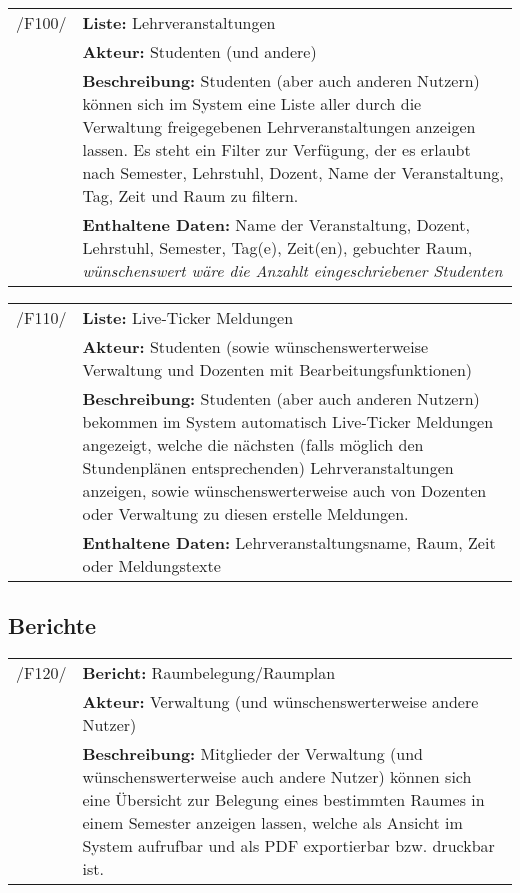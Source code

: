 \begin{tabular}{p{1.5cm}p{14.5cm}}
	
	 /F100/& \textbf{Liste:} Lehrveranstaltungen \\
				& \textbf{Akteur:} Studenten (und andere) \\
				& \textbf{Beschreibung:} Studenten (aber auch anderen Nutzern) können sich im System eine Liste aller durch die Verwaltung freigegebenen Lehrveranstaltungen anzeigen lassen. Es steht ein Filter zur Verfügung, der es erlaubt nach Semester, Lehrstuhl, Dozent, Name der Veranstaltung, Tag, Zeit und Raum zu filtern.\\
				& \textbf{Enthaltene Daten:} Name der Veranstaltung, Dozent, Lehrstuhl, Semester, Tag(e), Zeit(en), gebuchter Raum, \textsl{wünschenswert wäre die Anzahlt eingeschriebener Studenten} \\[0.25cm]

\end{tabular}


\begin{tabular}{p{1.5cm}p{14.5cm}}
	
	 /F110/& \textbf{Liste:} Live-Ticker Meldungen \\
				& \textbf{Akteur:} Studenten (sowie wünschenswerterweise Verwaltung und Dozenten mit Bearbeitungsfunktionen) \\
				& \textbf{Beschreibung:} Studenten (aber auch anderen Nutzern) bekommen im System automatisch Live-Ticker Meldungen angezeigt, welche die nächsten (falls möglich den Stundenplänen entsprechenden) Lehrveranstaltungen anzeigen, sowie wünschenswerterweise auch von Dozenten oder Verwaltung zu diesen erstelle Meldungen.\\
				& \textbf{Enthaltene Daten:} Lehrveranstaltungsname, Raum, Zeit oder Meldungstexte \\[0.25cm]

				
\end{tabular}


\subsection{Berichte}


\begin{tabular}{p{1.5cm}p{14.5cm}}


	 /F120/& \textbf{Bericht:} Raumbelegung/Raumplan \\
				& \textbf{Akteur:} Verwaltung (und wünschenswerterweise andere Nutzer) \\
				& \textbf{Beschreibung:} Mitglieder der Verwaltung (und wünschenswerterweise auch andere Nutzer) können sich eine Übersicht zur Belegung eines bestimmten Raumes in einem Semester anzeigen lassen, welche als Ansicht im System aufrufbar und als PDF exportierbar bzw. druckbar ist. \\[0.25cm]

\end{tabular}


